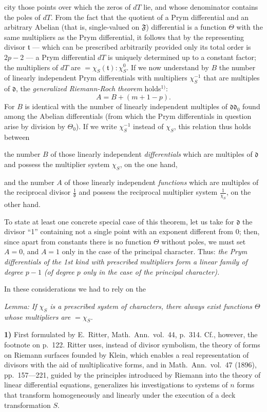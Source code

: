 \documentclass{article}
\begin{document}
city those points over which the zeros of $dT$ lie, and whose denominator contains the poles of $dT$. From the fact that the quotient of a Prym differential and an arbitrary Abelian (that is, single-valued on $\mathfrak{F}$) differential is a function $\Theta$ with the same multipliers as the Prym differential, it follows that by the representing divisor $\mathfrak{t}$ --- which can be prescribed arbitrarily provided only its total order is $2p - 2$ --- a Prym differential $dT$ is uniquely determined up to a constant factor; the multipliers of $dT$ are $= \chi_S(\mathfrak{t}) : \chi_S^0$. If we now understand by $B$ the number of linearly independent Prym differentials with multipliers $\chi_S^{-1}$ that are multiples of $\mathfrak{d}$, the \emph{generalized Riemann-Roch theorem} holds${}^{1)}$:
\[ A = B + (m + 1 - p). \]
For $B$ is identical with the number of linearly independent multiples of $\mathfrak{d}\mathfrak{d}_0$ found among the Abelian differentials (from which the Prym differentials in question arise by division by $\Theta_0$). If we write $\chi_S^{-1}$ instead of $\chi_S$, this relation thus holds between

the number $B$ of those linearly independent \emph{differentials} which are multiples of $\mathfrak{d}$ and possess the multiplier system $\chi_S$, on the one hand,

and the number $A$ of those linearly independent \emph{functions} which are multiples of the reciprocal divisor $\frac{1}{\mathfrak{d}}$ and possess the reciprocal multiplier system $\frac{1}{\chi_S}$, on the other hand.

To state at least one concrete special case of this theorem, let us take for $\mathfrak{d}$ the divisor ``1'' containing not a single point with an exponent different from 0; then, since apart from constants there is no function $\Theta$ without poles, we must set $A = 0$, and $A = 1$ only in the case of the principal character. Thus: \emph{the Prym differentials of the 1st kind with prescribed multipliers form a linear family of degree $p - 1$ (of degree $p$ only in the case of the principal character).}

In these considerations we had to rely on the

\emph{Lemma: If $\chi_S$ is a prescribed system of characters, there always exist functions $\Theta$ whose multipliers are $= \chi_S$.}

\textbf{1)} First formulated by E.~Ritter, Math.\ Ann.\ vol.~44, p.~314. Cf., however, the footnote on p.~122. Ritter uses, instead of divisor symbolism, the theory of forms on Riemann surfaces founded by Klein, which enables a real representation of divisors with the aid of multiplicative forms, and in Math.\ Ann.\ vol.~47 (1896), pp.~157---221, guided by the principles introduced by Riemann into the theory of linear differential equations, generalizes his investigations to systems of $n$ forms that transform homogeneously and linearly under the execution of a deck transformation $S$.
\end{document}

